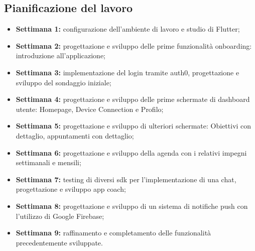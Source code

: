 \subsection{Pianificazione del lavoro}
\begin{itemize}
    \item \textbf{Settimana 1:} configurazione dell'ambiente di lavoro e studio di Flutter;
    \item \textbf{Settimana 2:} progettazione e sviluppo delle prime funzionalità onboarding: introduzione all'applicazione;
    \item \textbf{Settimana 3:} implementazione del login tramite auth0, progettazione e sviluppo del sondaggio iniziale;
    \item \textbf{Settimana 4:} progettazione e sviluppo delle prime schermate di dashboard utente: Homepage, Device Connection e Profilo;
    \item \textbf{Settimana 5:} progettazione e sviluppo di ulteriori schermate: Obiettivi con dettaglio, appuntamenti con dettaglio;
    \item \textbf{Settimana 6:} progettazione e sviluppo della agenda con i relativi impegni settimanali e mensili;
    \item \textbf{Settimana 7:} testing di diversi sdk per l'implementazione di una chat, progettazione e sviluppo app coach;
    \item \textbf{Settimana 8:} progettazione e sviluppo di un sistema di notifiche push con l'utilizzo di Google Firebase;
    \item \textbf{Settimana 9:} raffinamento e completamento delle funzionalità precedentemente sviluppate.
\end{itemize}


